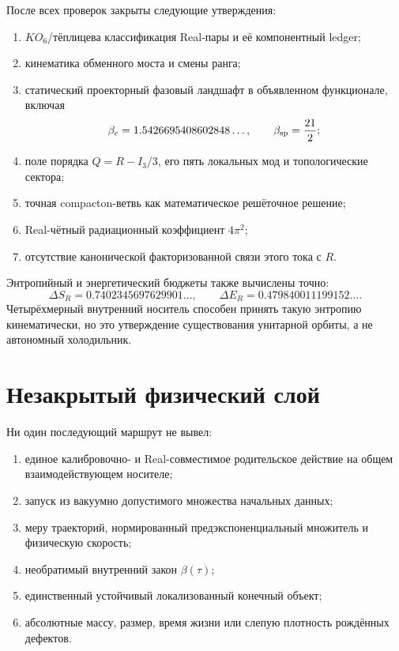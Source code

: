 После всех проверок закрыты следующие утверждения:
\begin{enumerate}
 \item $KO_6$/тёплицева классификация Real-пары и её компонентный ledger;
 \item кинематика обменного моста и смены ранга;
 \item статический проекторный фазовый ландшафт в объявленном функционале,
 включая
 \begin{equation}
  \beta_c=1.5426695408602848\ldots,
  \qquad \beta_{\rm sp}=\frac{21}{2};
 \end{equation}
 \item поле порядка $Q=R-I_3/3$, его пять локальных мод и топологические
 сектора;
 \item точная compacton-ветвь как математическое решёточное решение;
 \item Real-чётный радиационный коэффициент $4\pi^2$;
 \item отсутствие канонической факторизованной связи этого тока с $R$.
\end{enumerate}

Энтропийный и энергетический бюджеты также вычислены точно:
\begin{equation}
 \Delta S_R=0.7402345697629901\ldots,
 \qquad
 \Delta E_R=0.479840011199152\ldots.
\end{equation}
Четырёхмерный внутренний носитель способен принять такую энтропию
кинематически, но это утверждение существования унитарной орбиты, а не
автономный холодильник.

\section{Незакрытый физический слой}

Ни один последующий маршрут не вывел:
\begin{enumerate}
 \item единое калибровочно- и Real-совместимое родительское действие на общем
 взаимодействующем носителе;
 \item запуск из вакуумно допустимого множества начальных данных;
 \item меру траекторий, нормированный предэкспоненциальный множитель и
 физическую скорость;
 \item необратимый внутренний закон $\beta(\tau)$;
 \item единственный устойчивый локализованный конечный объект;
 \item абсолютные массу, размер, время жизни или слепую плотность
 рождённых дефектов.
\end{enumerate}


